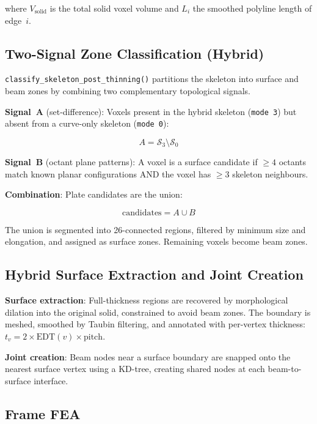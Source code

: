 \documentclass[a4paper, 11pt, openany]{report}
\begin{document}
where $V_{\text{solid}}$ is the total solid voxel volume and $L_i$ the smoothed
polyline length of edge~$i$.


\subsection{Two-Signal Zone Classification (Hybrid)}
\label{sec:alg-zone}

\texttt{classify\_skeleton\_post\_thinning()} partitions the skeleton into
surface and beam zones by combining two complementary topological signals.

\textbf{Signal~A} (set-difference): Voxels present in the hybrid skeleton
(\texttt{mode~3}) but absent from a curve-only skeleton (\texttt{mode~0}):

\begin{equation}
\label{eq:signal-a}
A = \mathcal{S}_3 \setminus \mathcal{S}_0
\end{equation}

\textbf{Signal~B} (octant plane patterns): A voxel is a surface candidate if
$\ge 4$ octants match known planar configurations AND the voxel has $\ge 3$
skeleton neighbours.

\textbf{Combination}: Plate candidates are the union:

\begin{equation}
\label{eq:zone-union}
\text{candidates} = A \cup B
\end{equation}

The union is segmented into 26-connected regions, filtered by minimum size and
elongation, and assigned as surface zones.  Remaining voxels become beam zones.


\subsection{Hybrid Surface Extraction and Joint Creation}

\textbf{Surface extraction}: Full-thickness regions are recovered by
morphological dilation into the original solid, constrained to avoid beam zones.
The boundary is meshed, smoothed by Taubin filtering, and annotated with
per-vertex thickness: $t_v = 2 \times \text{EDT}(v) \times \text{pitch}$.

\textbf{Joint creation}: Beam nodes near a surface boundary are snapped onto
the nearest surface vertex using a KD-tree, creating shared nodes at each
beam-to-surface interface.


\subsection{Frame FEA}
\label{sec:alg-fea}
\end{document}

